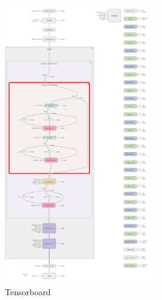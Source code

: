 \documentclass{article}
\begin{document}
\begin{figure}[p]
				\centering
				\includegraphics[width=0.6\textwidth]{figures/cifar_4_Extended}
				\caption{Tensorboard}
				\label{fig:tensorboard}
			\end{figure}
\end{document}

